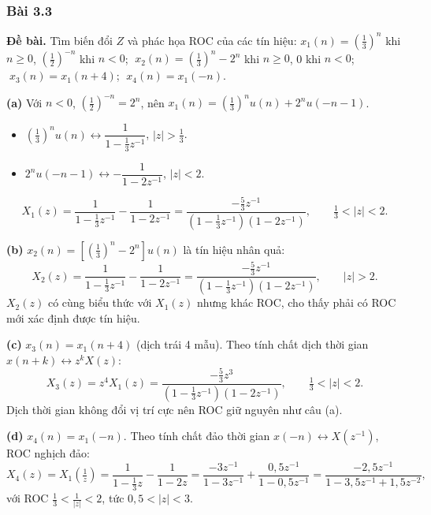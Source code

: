 \documentclass[12pt,a4paper]{article}
\begin{document}
\subsubsection*{Bài 3.3}
\textbf{Đề bài.} Tìm biến đổi $Z$ và phác họa ROC của các tín hiệu:
$x_1(n)=\left(\tfrac13\right)^n$ khi $n\ge0$, $\left(\tfrac12\right)^{-n}$ khi $n<0$; $\;x_2(n)=\left(\tfrac13\right)^n-2^n$ khi $n\ge0$, 0 khi $n<0$; $\;x_3(n)=x_1(n+4)$; $\;x_4(n)=x_1(-n)$.

\noindent\textbf{(a)} Với $n<0$, $\left(\tfrac12\right)^{-n}=2^n$, nên $x_1(n)=\left(\tfrac13\right)^nu(n)+2^nu(-n-1)$.
\begin{itemize}[leftmargin=*]
    \item $\left(\tfrac13\right)^nu(n)\leftrightarrow\dfrac{1}{1-\frac13z^{-1}}$, $|z|>\tfrac13$.
    \item $2^nu(-n-1)\leftrightarrow-\dfrac{1}{1-2z^{-1}}$, $|z|<2$.
\end{itemize}
\[
X_1(z)=\frac{1}{1-\frac13z^{-1}}-\frac{1}{1-2z^{-1}}=\frac{-\frac53z^{-1}}{\left(1-\frac13z^{-1}\right)\left(1-2z^{-1}\right)},\qquad \tfrac13<|z|<2.
\]

\noindent\textbf{(b)} $x_2(n)=\left[\left(\tfrac13\right)^n-2^n\right]u(n)$ là tín hiệu nhân quả:
\[
X_2(z)=\frac{1}{1-\frac13z^{-1}}-\frac{1}{1-2z^{-1}}=\frac{-\frac53z^{-1}}{\left(1-\frac13z^{-1}\right)\left(1-2z^{-1}\right)},\qquad |z|>2.
\]
$X_2(z)$ có cùng biểu thức với $X_1(z)$ nhưng khác ROC, cho thấy phải có ROC mới xác định được tín hiệu.

\noindent\textbf{(c)} $x_3(n)=x_1(n+4)$ (dịch trái 4 mẫu). Theo tính chất dịch thời gian $x(n+k)\leftrightarrow z^{k}X(z)$:
\[
X_3(z)=z^4X_1(z)=\frac{-\frac53z^{3}}{\left(1-\frac13z^{-1}\right)\left(1-2z^{-1}\right)},\qquad \tfrac13<|z|<2.
\]
Dịch thời gian không đổi vị trí cực nên ROC giữ nguyên như câu (a).

\noindent\textbf{(d)} $x_4(n)=x_1(-n)$. Theo tính chất đảo thời gian $x(-n)\leftrightarrow X(z^{-1})$, ROC nghịch đảo:
\[
X_4(z)=X_1\!\left(\tfrac1z\right)=\frac{1}{1-\frac13z}-\frac{1}{1-2z}=\frac{-3z^{-1}}{1-3z^{-1}}+\frac{0{,}5z^{-1}}{1-0{,}5z^{-1}}=\frac{-2{,}5z^{-1}}{1-3{,}5z^{-1}+1{,}5z^{-2}},
\]
với ROC $\tfrac13<\tfrac{1}{|z|}<2$, tức $0{,}5<|z|<3$.
\end{document}
